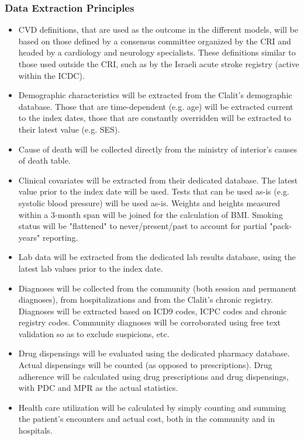 \documentclass[a4paper,12pt]{article}
\begin{document}
		\subsubsection{Data Extraction Principles}
		\begin{itemize}
			\item CVD definitions, that are used as the outcome in the different models, will be based on those defined by a consensus committee organized by the CRI and headed by a cardiology and neurology specialists. These definitions similar to those used outside the CRI, such as by the Israeli acute stroke registry\cite{ICDC2017} (active within the ICDC).
			\item Demographic characteristics will be extracted from the Clalit's demographic database. Those that are time-dependent (e.g. age) will be extracted current to the index dates, those that are constantly overridden will be extracted to their latest value (e.g. SES).
			\item Cause of death will be collected directly from the ministry of interior's causes of death table.
			\item Clinical covariates will be extracted from their dedicated database. The latest value prior to the index date will be used. Tests that can be used as-is (e.g. systolic blood pressure) will be used as-is. Weights and heights measured within a 3-month span will be joined for the calculation of BMI. Smoking status will be "flattened" to never/present/past to account for partial "pack-years" reporting.
			\item Lab data will be extracted from the dedicated lab results database, using the latest lab values prior to the index date.
			\item Diagnoses will be collected from the community (both session and permanent diagnoses), from hospitalizations and from the Clalit's chronic registry\cite{Rennert2001}. Diagnoses will be extracted based on ICD9 codes, ICPC codes and chronic registry codes. Community diagnoses will be corroborated using free text validation so as to exclude suspicions, etc.
			\item Drug dispensings will be evaluated using the dedicated pharmacy database. Actual dispensings will be counted (as opposed to prescriptions). Drug adherence will be calculated using drug prescriptions and drug dispensings, with PDC and MPR as the actual statistics\cite{Lam2015}.
			\item Health care utilization will be calculated by simply counting and summing the patient's encounters and actual cost, both in the community and in hospitals.
		\end{itemize}
	
\end{document}

